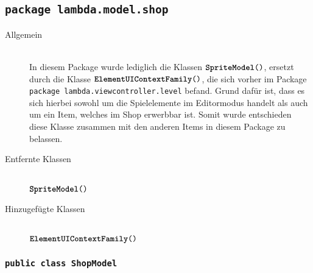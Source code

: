 \subsection{\texttt{package lambda.model.shop}}

\begin{description}
\item[Allgemein] \hfill \\ In diesem Package wurde lediglich die Klassen $\texttt{\textbf{SpriteModel}()}$, ersetzt durch die Klasse $\texttt{\textbf{ElementUIContextFamily}()}$, die sich vorher im Package \texttt{package lambda.viewcontroller.level} befand. Grund dafür ist, dass es sich hierbei sowohl um die Spielelemente im Editormodus handelt als auch um ein Item, welches im Shop erwerbbar ist. Somit wurde entschieden diese Klasse zusammen mit den anderen Items in diesem Package zu belassen.

\item[Entfernte Klassen] \hfill \\ $\texttt{\textbf{SpriteModel}()}$
\item[Hinzugefügte Klassen] \hfill \\ $\texttt{\textbf{ElementUIContextFamily}()}$
\end{description}

\subsubsection{\normalfont \texttt{public class \textbf{ShopModel}}}

